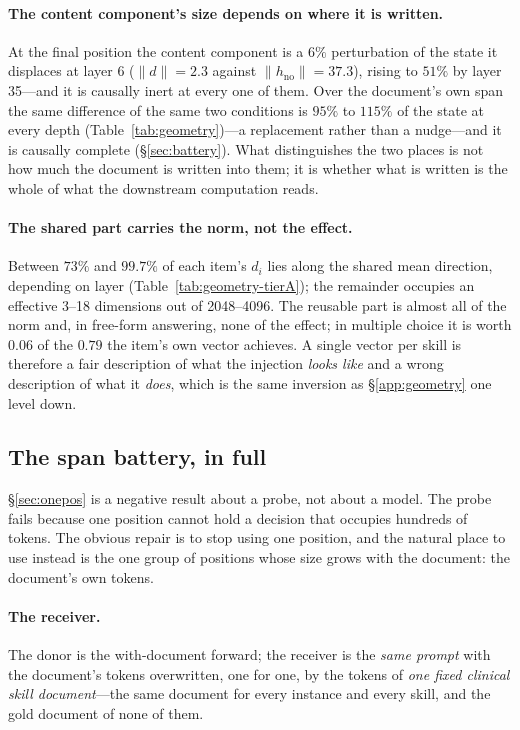 \documentclass{article}
\newcommand{\dvec}{\ensuremath{d}}
\begin{document}
\paragraph{The content component's size depends on where it is written.} At the
final position the content component is a $6\%$ perturbation of the state it
displaces at layer 6 ($\|\dvec\|=2.3$ against $\|h_{\text{no}}\|=37.3$), rising
to $51\%$ by layer 35---and it is causally inert at every one of them. Over the
document's own span the same difference of the same two conditions is $95\%$ to
$115\%$ of the state at every depth (Table~\ref{tab:geometry})---a replacement
rather than a nudge---and it is causally complete (\S\ref{sec:battery}). What
distinguishes the two places is not how much the document is written into them;
it is whether what is written is the whole of what the downstream computation
reads.

\paragraph{The shared part carries the norm, not the effect.} Between $73\%$ and $99.7\%$ of each item's
$\dvec_i$ lies along the shared mean direction, depending on layer
(Table~\ref{tab:geometry-tierA}); the remainder occupies an effective 3--18 dimensions
out of 2048--4096. The reusable part is almost all of the norm and, in free-form
answering, none of the effect; in multiple choice it is worth $0.06$ of the
$0.79$ the item's own vector achieves. A single vector per skill is therefore a
fair description of
what the injection \emph{looks like} and a wrong description of what it
\emph{does}, which is the same inversion as \S\ref{app:geometry} one level
down.




\subsection{The span battery, in full}
\label{app:battery}

\S\ref{sec:onepos} is a negative result about a probe, not about a model. The
probe fails because one position cannot hold a decision that occupies hundreds
of tokens. The obvious repair is to stop using one position, and the natural
place to use instead is the one group of positions whose size grows with the
document: the document's own tokens.

\paragraph{The receiver.} The donor is the with-document forward; the receiver
is the \emph{same prompt} with the document's tokens overwritten, one for one,
by the tokens of \emph{one fixed clinical skill document}---the same document
for every instance and every skill, and the gold document of none of them.
\end{document}
